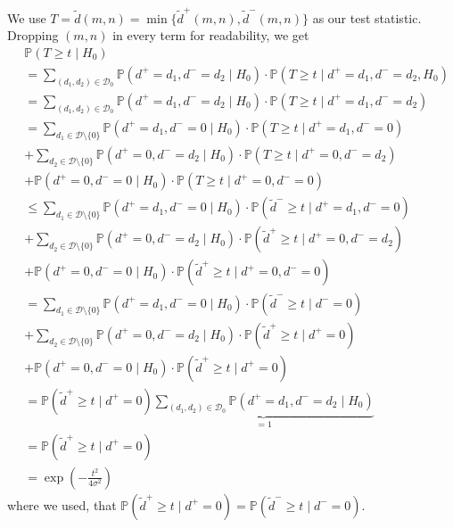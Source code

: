 \documentclass[a4paper,12pt]{article}
\theoremstyle{plain}
\theoremstyle{definition}
\theoremstyle{remark}
\begin{document}
We use $T = \tilde{d}(m, n) = \min \{ \tilde{d}^+(m, n), \tilde{d}^-(m, n) \}$ as our test statistic. Dropping $(m, n)$ in every term for readability, we get
\begin{align*}
	&\mathbb{P}(T \geq t \mid H_0) \\
	&= \sum_{(d_1, d_2) \in \mathcal{D}_0} \mathbb{P}(d^+ = d_1, d^- = d_2 \mid H_0) \cdot \mathbb{P}(T \geq t \mid d^+ = d_1, d^- = d_2, H_0) \\
	&= \sum_{(d_1, d_2) \in \mathcal{D}_0} \mathbb{P}(d^+ = d_1, d^- = d_2 \mid H_0) \cdot \mathbb{P}(T \geq t \mid d^+ = d_1, d^- = d_2) \\
	&= \sum_{d_1 \in \mathcal{D} \setminus \{ 0 \}} \mathbb{P}(d^+ = d_1, d^- = 0 \mid H_0) \cdot \mathbb{P}(T \geq t \mid d^+ = d_1, d^- = 0) \\
	&+ \sum_{d_2 \in \mathcal{D} \setminus \{ 0 \}} \mathbb{P}(d^+ = 0, d^- = d_2 \mid H_0) \cdot \mathbb{P}(T \geq t \mid d^+ = 0, d^- = d_2) \\
	&+ \mathbb{P}(d^+ = 0, d^- = 0 \mid H_0) \cdot \mathbb{P}(T \geq t \mid d^+ = 0, d^- = 0) \\
	&\leq \sum_{d_1 \in \mathcal{D} \setminus \{ 0 \}} \mathbb{P}(d^+ = d_1, d^- = 0 \mid H_0) \cdot \mathbb{P}(\tilde{d}^- \geq t \mid d^+ = d_1, d^- = 0) \\
	&+ \sum_{d_2 \in \mathcal{D} \setminus \{ 0 \}} \mathbb{P}(d^+ = 0, d^- = d_2 \mid H_0) \cdot \mathbb{P}(\tilde{d}^+ \geq t \mid d^+ = 0, d^- = d_2) \\
	&+ \mathbb{P}(d^+ = 0, d^- = 0 \mid H_0) \cdot \mathbb{P}(\tilde{d}^+ \geq t \mid d^+ = 0, d^- = 0) \\
	&= \sum_{d_1 \in \mathcal{D} \setminus \{ 0 \}} \mathbb{P}(d^+ = d_1, d^- = 0 \mid H_0) \cdot \mathbb{P}(\tilde{d}^- \geq t \mid d^- = 0) \\
	&+ \sum_{d_2 \in \mathcal{D} \setminus \{ 0 \}} \mathbb{P}(d^+ = 0, d^- = d_2 \mid H_0) \cdot \mathbb{P}(\tilde{d}^+ \geq t \mid d^+ = 0) \\
	&+ \mathbb{P}(d^+ = 0, d^- = 0 \mid H_0) \cdot \mathbb{P}(\tilde{d}^+ \geq t \mid d^+ = 0) \\
	&= \mathbb{P}(\tilde{d}^+ \geq t \mid d^+ = 0) \underbrace{\sum_{(d_1, d_2) \in \mathcal{D}_0} \mathbb{P}(d^+ = d_1, d^- = d_2 \mid H_0)}_{= 1} \\
	&= \mathbb{P}(\tilde{d}^+ \geq t \mid d^+ = 0) \\
	&= \exp \left( - \frac{t^2}{4 \sigma^2} \right)
\end{align*}
where we used, that $\mathbb{P}(\tilde{d}^+ \geq t \mid d^+ = 0) = \mathbb{P}(\tilde{d}^- \geq t \mid d^- = 0)$.
\end{document}
